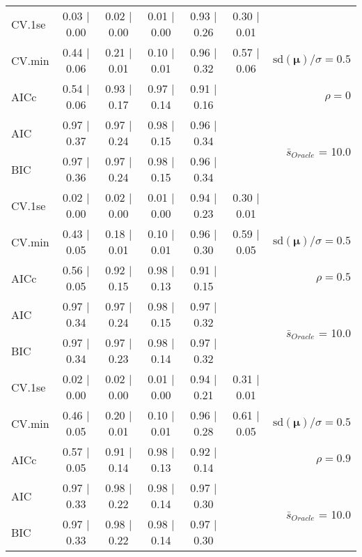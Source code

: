 \begin{table}
\begin{center}
\begin{tabular}{l*{5}{c}|r}
 \hline 
CV.1se & 0.03 $\mid$ 0.00 & 0.02 $\mid$ 0.00 & 0.01 $\mid$ 0.00 & 0.93 $\mid$ 0.26 & 0.30 $\mid$ 0.01 & \\
CV.min & 0.44 $\mid$ 0.06 & 0.21 $\mid$ 0.01 & 0.10 $\mid$ 0.01 & 0.96 $\mid$ 0.32 & 0.57 $\mid$ 0.06 &  $\mathrm{sd}(\mathbf{\mu})/\sigma=0.5$ \\
AICc & 0.54 $\mid$ 0.06 & 0.93 $\mid$ 0.17 & 0.97 $\mid$ 0.14 & 0.91 $\mid$ 0.16 & & $\rho=0$ \\
AIC & 0.97 $\mid$ 0.37 & 0.97 $\mid$ 0.24 & 0.98 $\mid$ 0.15 & 0.96 $\mid$ 0.34 & &  \multirow{2}{*}{$\bar{s}_{Oracle}$ = 10.0} \\
BIC & 0.97 $\mid$ 0.36 & 0.97 $\mid$ 0.24 & 0.98 $\mid$ 0.15 & 0.96 $\mid$ 0.34 & &  \\
 \hline 
CV.1se & 0.02 $\mid$ 0.00 & 0.02 $\mid$ 0.00 & 0.01 $\mid$ 0.00 & 0.94 $\mid$ 0.23 & 0.30 $\mid$ 0.01 & \\
CV.min & 0.43 $\mid$ 0.05 & 0.18 $\mid$ 0.01 & 0.10 $\mid$ 0.01 & 0.96 $\mid$ 0.30 & 0.59 $\mid$ 0.05 &  $\mathrm{sd}(\mathbf{\mu})/\sigma=0.5$ \\
AICc & 0.56 $\mid$ 0.05 & 0.92 $\mid$ 0.15 & 0.98 $\mid$ 0.13 & 0.91 $\mid$ 0.15 & & $\rho=0.5$ \\
AIC & 0.97 $\mid$ 0.34 & 0.97 $\mid$ 0.24 & 0.98 $\mid$ 0.15 & 0.97 $\mid$ 0.32 & &  \multirow{2}{*}{$\bar{s}_{Oracle}$ = 10.0} \\
BIC & 0.97 $\mid$ 0.34 & 0.97 $\mid$ 0.23 & 0.98 $\mid$ 0.14 & 0.97 $\mid$ 0.32 & &  \\
 \hline 
CV.1se & 0.02 $\mid$ 0.00 & 0.02 $\mid$ 0.00 & 0.01 $\mid$ 0.00 & 0.94 $\mid$ 0.21 & 0.31 $\mid$ 0.01 & \\
CV.min & 0.46 $\mid$ 0.05 & 0.20 $\mid$ 0.01 & 0.10 $\mid$ 0.01 & 0.96 $\mid$ 0.28 & 0.61 $\mid$ 0.05 &  $\mathrm{sd}(\mathbf{\mu})/\sigma=0.5$ \\
AICc & 0.57 $\mid$ 0.05 & 0.91 $\mid$ 0.14 & 0.98 $\mid$ 0.13 & 0.92 $\mid$ 0.14 & & $\rho=0.9$ \\
AIC & 0.97 $\mid$ 0.33 & 0.98 $\mid$ 0.22 & 0.98 $\mid$ 0.14 & 0.97 $\mid$ 0.30 & &  \multirow{2}{*}{$\bar{s}_{Oracle}$ = 10.0} \\
BIC & 0.97 $\mid$ 0.33 & 0.98 $\mid$ 0.22 & 0.98 $\mid$ 0.14 & 0.97 $\mid$ 0.30 & &  \\
 \hline 
\end{tabular}
\end{center}
\vspace{-1cm}
\end{table}




